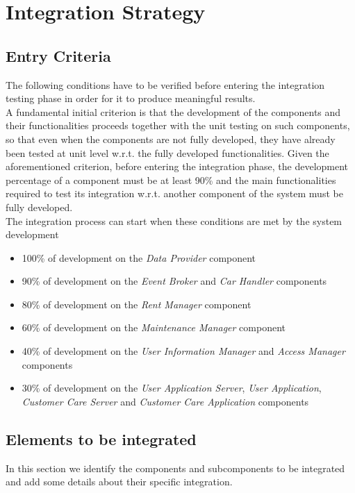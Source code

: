 \section{Integration Strategy}

\subsection{Entry Criteria}
\label{sec:entryCriteria}
The following conditions have to be verified before entering the integration testing phase in order for it to produce meaningful results.\\

A fundamental initial criterion is that the development of the components and their functionalities proceeds together with the unit testing on such components, so that even when the components are not fully developed, they have already been tested at unit level w.r.t. the fully developed functionalities. 
Given the aforementioned criterion, before entering the integration phase, the development percentage of a component must be at least 90\% and the main functionalities required to test its integration w.r.t. another component of the system must be fully developed.\\

The integration process can start when these conditions are met by the system development
\begin{itemize}
	\item 100\% of development on the \emph{Data Provider} component
	\item 90\% of development on the \emph{Event Broker} and \emph{Car Handler} components
	\item 80\% of development on the \emph{Rent Manager} component
	\item 60\% of development on the \emph{Maintenance Manager} component
	\item 40\% of development on the \emph{User Information Manager} and \emph{Access Manager} components
	\item 30\% of development on the \emph{User Application Server}, \emph{User Application}, \emph{Customer Care Server} and \emph{Customer Care Application} components
\end{itemize}

\subsection{Elements to be integrated}
In this section we identify the components and subcomponents to be integrated and add some details about their specific integration.\\

